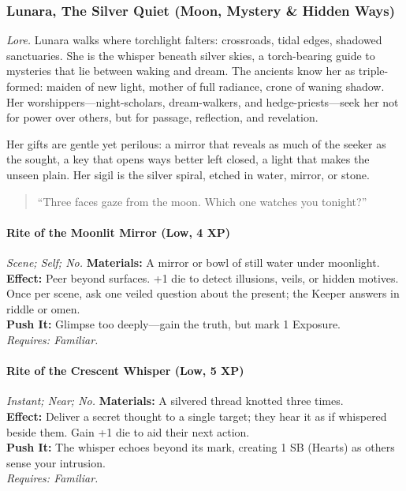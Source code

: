 
\subsubsection{Lunara, The Silver Quiet (Moon, Mystery \& Hidden Ways)}
\textit{Lore.} Lunara walks where torchlight falters: crossroads, tidal edges, shadowed sanctuaries. She is the whisper beneath silver skies, a torch-bearing guide to mysteries that lie between waking and dream. The ancients know her as triple-formed: maiden of new light, mother of full radiance, crone of waning shadow. Her worshippers—night-scholars, dream-walkers, and hedge-priests—seek her not for power over others, but for passage, reflection, and revelation.

Her gifts are gentle yet perilous: a mirror that reveals as much of the seeker as the sought, a key that opens ways better left closed, a light that makes the unseen plain. Her sigil is the silver spiral, etched in water, mirror, or stone.

\begin{quote}
“Three faces gaze from the moon. Which one watches you tonight?”  
\end{quote}

\paragraph*{Rite of the Moonlit Mirror (Low, 4 XP)}  
\emph{Scene; Self; No.}  
\textbf{Materials:} A mirror or bowl of still water under moonlight. \\  
\textbf{Effect:} Peer beyond surfaces. +1 die to detect illusions, veils, or hidden motives. Once per scene, ask one veiled question about the present; the Keeper answers in riddle or omen. \\  
\textbf{Push It:} Glimpse too deeply—gain the truth, but mark 1 Exposure. \\  
\emph{Requires: Familiar.}

\paragraph*{Rite of the Crescent Whisper (Low, 5 XP)}  
\emph{Instant; Near; No.}  
\textbf{Materials:} A silvered thread knotted three times. \\  
\textbf{Effect:} Deliver a secret thought to a single target; they hear it as if whispered beside them. Gain +1 die to aid their next action. \\  
\textbf{Push It:} The whisper echoes beyond its mark, creating 1 SB (Hearts) as others sense your intrusion. \\  
\emph{Requires: Familiar.}

